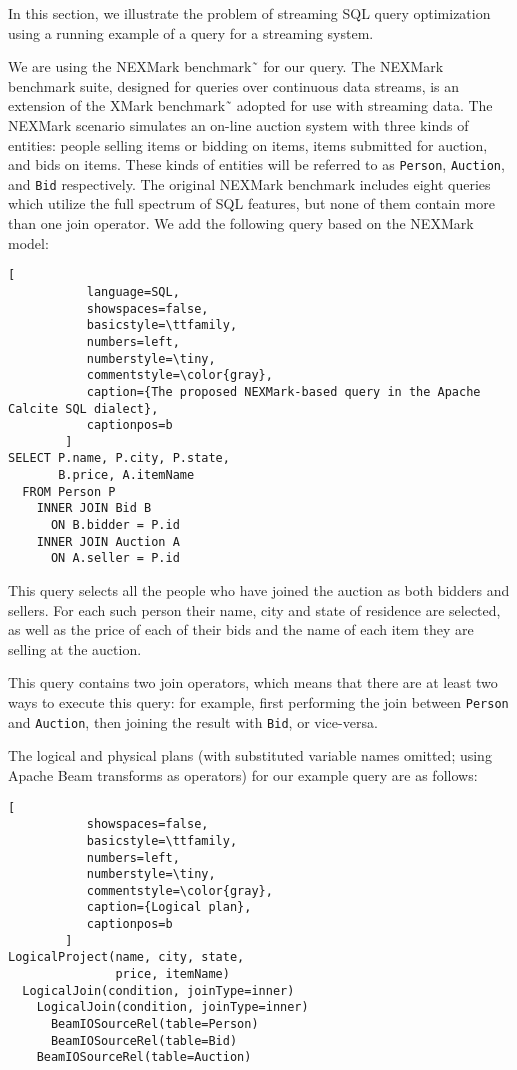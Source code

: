 \label {sec:fs-optimization-problem-statement}

In this section, we illustrate the problem of streaming SQL query optimization using a running example of a query for a streaming system.

We are using the NEXMark benchmark˜\cite{tucker2008nexmark} for our query. The NEXMark benchmark suite, designed for queries over continuous data streams, is an extension of the XMark benchmark˜\cite{schmidt2002xmark} adopted for use with streaming data. 
The NEXMark scenario simulates an on-line auction system with three kinds of entities: people selling items or bidding on items, items submitted for auction, and bids on items. 
These kinds of entities will be referred to as \texttt{Person}, \texttt{Auction}, and \texttt{Bid} respectively. 
The original NEXMark benchmark includes eight queries which utilize the full spectrum of SQL features, but none of them contain more than one join operator. We add the following query based on the NEXMark model: 

\begin{lstlisting}[
           language=SQL,
           showspaces=false,
           basicstyle=\ttfamily,
           numbers=left,
           numberstyle=\tiny,
           commentstyle=\color{gray},
           caption={The proposed NEXMark-based query in the Apache Calcite SQL dialect}, 
           captionpos=b
        ]
SELECT P.name, P.city, P.state, 
       B.price, A.itemName 
  FROM Person P 
    INNER JOIN Bid B 
      ON B.bidder = P.id 
    INNER JOIN Auction A 
      ON A.seller = P.id
\end{lstlisting}

This query selects all the people who have joined the auction as both bidders and sellers. 
For each such person their name, city and state of residence are selected, as well as the price of each of their bids and the name of each item they are selling at the auction. 

This query contains two join operators, which means that there are at least two ways to execute this query: for example, first performing the join between \texttt{Person} and \texttt{Auction}, then joining the result with \texttt{Bid}, or vice-versa. 

The logical and physical plans (with substituted variable names omitted; using Apache Beam transforms as operators) for our example query are as follows: 

\begin{lstlisting}[
           showspaces=false,
           basicstyle=\ttfamily,
           numbers=left,
           numberstyle=\tiny,
           commentstyle=\color{gray},
           caption={Logical plan}, 
           captionpos=b
        ]
LogicalProject(name, city, state, 
               price, itemName)
  LogicalJoin(condition, joinType=inner) 
    LogicalJoin(condition, joinType=inner)
      BeamIOSourceRel(table=Person)
      BeamIOSourceRel(table=Bid)
    BeamIOSourceRel(table=Auction)
\end{lstlisting}

